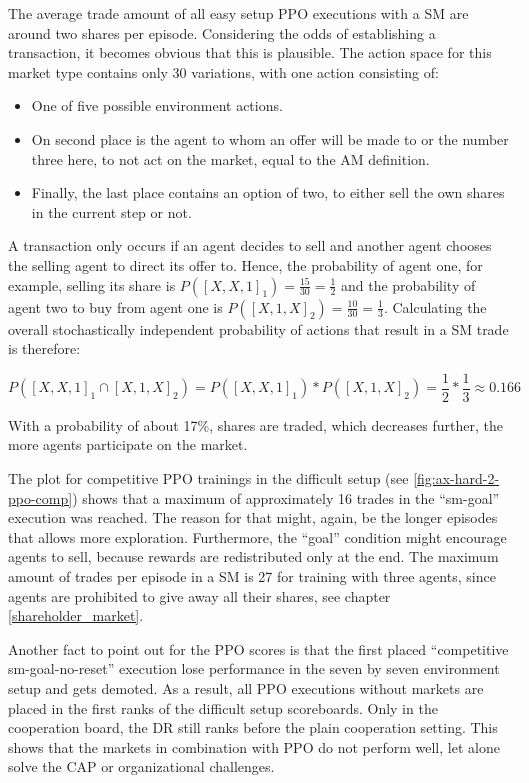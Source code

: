 The average trade amount of all easy setup PPO executions with a SM  are around two shares per episode. Considering the odds of establishing a transaction, it becomes obvious that this is plausible. The action space for this market type contains only 30 variations, with one action consisting of:
\begin{itemize}
    \item One of five possible environment actions.
    \item On second place is the agent to whom an offer will be made to or the number three here, to not act on the market, equal to the AM definition.
    \item Finally, the last place contains an option of two, to either sell the own shares in the current step or not.
\end{itemize}
A transaction only occurs if an agent decides to sell and another agent chooses the selling agent to direct its offer to. Hence, the probability of agent one, for example, selling its share is $P([X,X,1]_{1})=\frac{15}{30}=\frac{1}{2}$ and the probability of agent two to buy from agent one is $P([X,1,X]_{2})=\frac{10}{30}=\frac{1}{3}$. Calculating the overall stochastically independent probability of actions that result in a SM trade is therefore: 

\begin{equation}\label{eq:prob_sm}
    P([X,X,1]_{1} \cap [X,1,X]_{2})=P([X,X,1]_{1}) * P([X,1,X]_{2}) = \frac{1}{2}*\frac{1}{3} \approx 0.166
\end{equation}

With a probability of about 17\%, shares are traded, which decreases further, the more agents participate on the market.

The plot for competitive PPO trainings in the difficult setup (see \ref{fig:ax-hard-2-ppo-comp}) shows that a maximum of approximately 16 trades in the ``sm-goal'' execution was reached. The reason for that might, again, be the longer episodes that allows more exploration. Furthermore, the ``goal'' condition might encourage agents to sell, because rewards are redistributed only at the end. The maximum amount of trades per episode in a SM is 27 for training with three agents, since agents are prohibited to give away all their shares, see chapter \ref{shareholder_market}.

Another fact to point out for the PPO scores is that the first placed ``competitive sm-goal-no-reset'' execution lose performance in the seven by seven environment setup and gets demoted. As a result, all PPO executions without markets are placed in the first ranks of the difficult setup scoreboards. Only in the cooperation board, the DR still ranks before the plain cooperation setting. This shows that the markets in combination with PPO do not perform well, let alone solve the CAP or organizational challenges.

